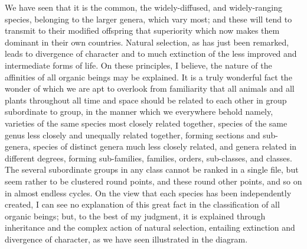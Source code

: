 \indent We have seen that it is the common, the widely-diffused, and widely-ranging species, belonging to the larger genera, which vary most; and these will tend to transmit to their modified offspring that superiority which now makes them dominant in their own countries. Natural selection, as has just been remarked, leads to divergence of character and to much extinction of the less improved and intermediate forms of life. On these principles, I believe, the nature of the affinities of all organic beings may be explained. It is a truly wonderful fact the wonder of which we are apt to overlook from familiarity that all animals and all plants throughout all time and space should be related to each other in group subordinate to group, in the manner which we everywhere behold namely, varieties of the same species most closely related together, species of the same genus less closely and unequally related together, forming sections and sub-genera, species of distinct genera much less closely related, and genera related in different degrees, forming sub-families, families, orders, sub-classes, and classes. The several subordinate groups in any class cannot be ranked in a single file, but seem rather to be clustered round points, and these round other points, and so on in almost endless cycles. On the view that each species has been independently created, I can see no explanation of this great fact in the classification of all organic beings; but, to the best of my judgment, it is explained through inheritance and the complex action of natural selection, entailing extinction and divergence of character, as we have seen illustrated in the diagram. \\

